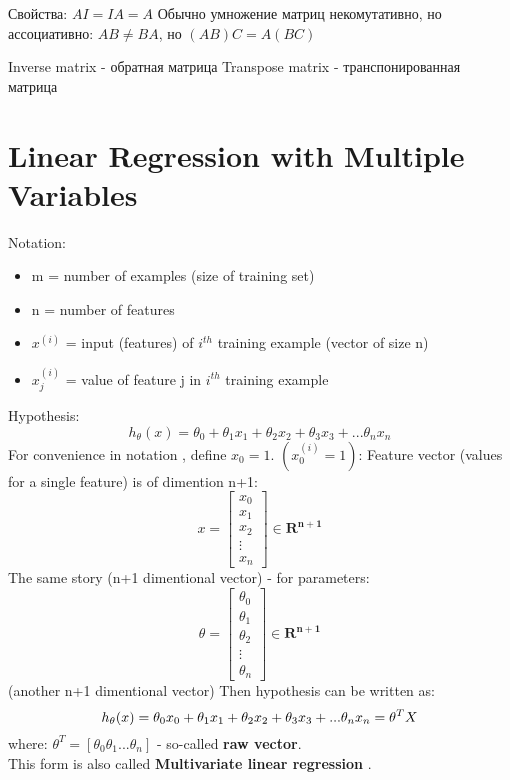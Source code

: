 \documentclass{scrartcl}
\begin{document}
Свойства: $A I = I A = A$ Обычно умножение матриц некомутативно, но
ассоциативно: $A B \neq B A$, но $(A B) C = A (B C)$

Inverse matrix - обратная матрица Transpose matrix - транспонированная
матрица

\label{Chapter 4}
\section {Linear Regression with Multiple Variables}
Notation: \\
\begin{itemize}
\item {m} = number of examples (size of training set)
\item {n} = number of features
\item{$x^{(i)}$} = input (features) of $i^{th}$ training example
  (vector of size n)
\item {$x_j^{(i)}$} = value of feature j in $i^{th}$ training example
\end{itemize}
Hypothesis: \\
\[
h_\theta(x) = \theta_0 + \theta_1x_1 + \theta_2x_2 + \theta_3x_3 + ...
\theta_nx_n
\]
For convenience in notation , define $x_0=1$. $(x_0^{(i)}=1)$: Feature
vector (values for a single feature) is of dimention n+1:
\[
x = \left[ \begin{array}{c} x_0 \\ x_1 \\ x_2 \\ \vdots \\ x_n
  \end{array} \right] \in \mathbf{R^{n+1}}
\]
The same story (n+1 dimentional vector) - for parameters:
\[
\theta = \left[ \begin{array}{c} \theta_0 \\ \theta_1 \\ \theta_2 \\
    \vdots \\ \theta_n
  \end{array} \right] \in \mathbf{R^{n+1}}
\]
(another n+1 dimentional vector) Then hypothesis can be written as:
\[
h_\theta(x) = \theta_0x_0 + \theta_1x_1 + \theta_2x_2 + \theta_3x_3 +
... \theta_nx_n = \\ \theta^TX
\]
where: $\theta^T = [\theta_0 \theta_1 ... \theta_n]$ - so-called {\bf
  raw vector}. \\

This form is also called {\bf Multivariate linear regression }.
\end{document}
